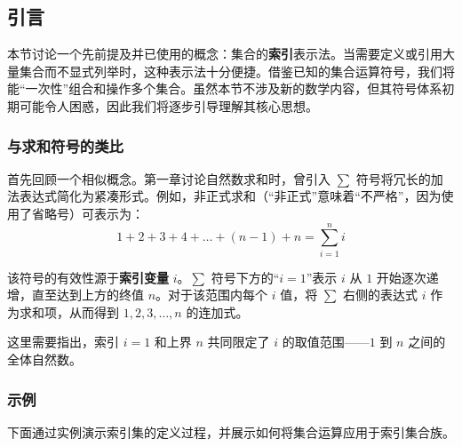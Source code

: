 \subsection{引言}

本节讨论一个先前提及并已使用的概念：集合的\textbf{索引}表示法。当需要定义或引用大量集合而不显式列举时，这种表示法十分便捷。借鉴已知的集合运算符号，我们将能``一次性''组合和操作多个集合。虽然本节不涉及新的数学内容，但其符号体系初期可能令人困惑，因此我们将逐步引导理解其核心思想。

\subsubsection*{与求和符号的类比}

首先回顾一个相似概念。第一章讨论自然数求和时，曾引入 $\sum$ 符号将冗长的加法表达式简化为紧凑形式。例如，非正式求和（``非正式''意味着``不严格''，因为使用了省略号）可表示为：
\[1 + 2 + 3 + 4 + \dots + (n - 1) + n = \sum_{i=1}^{n} i\]

该符号的有效性源于\textbf{索引变量} $i$。$\sum$ 符号下方的``$i = 1$''表示 $i$ 从 $1$ 开始逐次递增，直至达到上方的终值 $n$。对于该范围内每个 $i$ 值，将 $\sum$ 右侧的表达式 $i$ 作为求和项，从而得到 $1, 2, 3,\dots, n$ 的连加式。

这里需要指出，索引 $i = 1$ 和上界 $n$ 共同限定了 $i$ 的取值范围——$1$ 到 $n$ 之间的全体自然数。

\subsubsection*{示例}

下面通过实例演示索引集的定义过程，并展示如何将集合运算应用于索引集合族。

